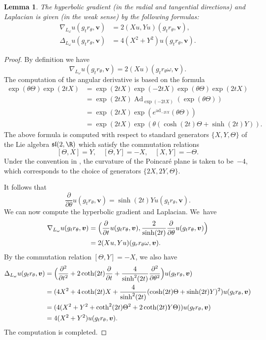 \documentclass[10pt]{amsart}
\DeclareMathOperator{\Ad}{Ad}
\DeclareMathOperator{\ad}{ad}
\theoremstyle{plain}
\newtheorem{lemma}[thm]{Lemma}
\theoremstyle{definition}
\numberwithin{equation}{subsection}
\let\laplacian\Delta
\newcommand{\bfv}{\boldsymbol{v}}
\begin{document}
\begin{lemma} The hyperbolic gradient (in the radial and tangential directions) and Laplacian is given (in the weak sense) by the following formulas:
\[
\begin{aligned}
\nabla_{L_\omega} u(g_t r_\theta, \bfv) &= 2 \left (X u, Y u \right) (g_t r_\theta, \bfv), \\ \laplacian_{L_\omega} u(g_t r_\theta, \bfv) &= 4 (X^2 + Y^2)u (g_t r_\theta, \bfv).
\end{aligned}
\]
\end{lemma}
\begin{proof}
By definition we have
\[
\nabla_{L_\omega} u(g_t r_\theta, \bfv) = 2(Xu) (g_t r_\theta \omega, \bfv).
\]
The computation of the angular derivative
is based on the formula
\[
\begin{aligned}
\exp (\theta \Theta)\exp (2t X) &=
\exp (2 tX) \exp (-2tX) \exp (\theta \Theta) \exp(2tX) \\
&=
\exp (2tX) \Ad_{\exp (-2 tX)}(\exp (\theta \Theta)) \\
&=\exp (2tX) \exp (e^{\ad_{-2tX}} (\theta\Theta)) \\ &= \exp (2tX) \exp(\theta (\cosh (2t) \Theta + \sinh(2t) Y)).
\end{aligned}
\]
The above formula is computed with respect to standard generators $\{X,Y,\Theta\}$ of
the Lie algebra $\mathfrak{sl}(2,\R)$ which
satisfy the commutation relations
\[
[\Theta, X]=Y, \quad [\Theta, Y]=-X, \quad [X,Y] = -\Theta.
\]
Under the convention in \cite{For02}, the curvature of the Poincaré plane is taken to be~$-4$, which corresponds to the choice of generators $\{2X, 2Y, \Theta\}$.

It follows that
\[
\frac{\partial}{\partial \theta} u(g_t r_\theta, \bfv) = \sinh(2t) Y u(g_t r_\theta, \bfv).
\]
We can now compute the hyperbolic gradient and Laplacian. We~have
\[
\begin{aligned}
\nabla_{L_\omega} u(g_t r_\theta, \bfv) &=
\Bigl(\frac{\partial}{\partial t } u(g_t r_\theta, \bfv),
\frac{2}{\sinh(2t)} \frac{\partial}{\partial \theta} u(g_t r_\theta, \bfv)\Bigr)
\\&= 2 (Xu, Y u) (g_rr_\theta \omega,\bfv).
\end{aligned}
\]
By the commutation relation $[\Theta, Y]=-X$, we also have
\[
\begin{aligned}
\laplacian_{L_\omega} u(g_t r_\theta, \bfv) &=\Bigl(
\frac{\partial^2}{\partial t^2} + 2\coth(2t)\frac{\partial}{\partial t}+\frac{4}{\sinh^2(2t)}\frac{\partial^2}{\partial \theta^2}\Bigr) u(g_t r_\theta, \bfv) \\
& = (4 X^2 + 4\coth(2t)X + \frac{4}{\sinh^2(2t)} (\cosh(2t) \Theta + \sinh(2t) Y)^2)u(g_t r_\theta, \bfv)
\\
& = (4 (X^2 + Y^2 + \coth^2(2t)\Theta^2 + 2 \coth (2t) Y \Theta))u(g_t r_\theta, \bfv)
\\
& = 4 (X^2 + Y^2)u(g_t r_\theta,\bfv).
\end{aligned}
\]
The computation is completed.
\end{proof}
\end{document}
